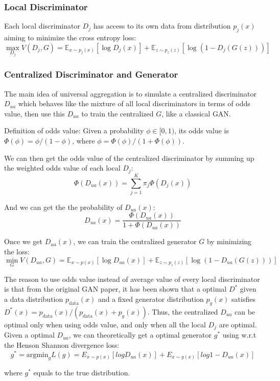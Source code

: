 \documentclass{article}
\begin{document}
\subsubsection{Local Discriminator}
Each local discriminator $D_j$ has access to its own data from distribution $p_j(x)$ aiming to minimize the cross entropy loss:
\[
\max_{D_j} V(D_j,G) = \mathbb{E}_{x \sim p_{j}(x)} [\log D_j(x)] + \mathbb{E}_{z \sim p_{z}(z)} [\log (1-D_j(G(z)))]
\]


\subsubsection{Centralized Discriminator and Generator}
The main idea of universal aggregation is to simulate a centralized discriminator $D_{ua}$ which behaves like the mixture of all local discriminators in terms of odds value, then use this $D_{ua}$ to train the centralized $G$, like a classical GAN.

Definition of odds value: Given a probability $\phi \in [0, 1)$, its odds value is $\Phi(\phi) = \phi / (1-\phi)$, where $\phi = \Phi(\phi) / (1+\Phi(\phi))$.

We can then get the odds value of the centralized discriminator by summing up the weighted odds value of each local $D_j$:
\[
\Phi(D_{ua}(x)) = \sum_{j=1}^K \pi_j \Phi(D_j(x))
\]

And we can get the the probability of $D_{ua}(x)$:
\[
D_{ua}(x) = \frac{\Phi(D_{ua}(x))}{1+\Phi(D_{ua}(x))}
\]

Once we get $D_{ua}(x)$, we can train the centralized generator $G$ by minimizing the loss:
\[
\min_{G} V(D_{ua},G) = \mathbb{E}_{x \sim p(x)} [\log D_{ua}(x)] + \mathbb{E}_{z \sim p_{z}(z)} [\log (1-D_{ua}(G(z)))]
\]

The reason to use odds value instead of average value of every local discriminator is that from the original GAN paper, it has been shown that a optimal $D^*$ given a data distribution $p_{\text{data}}(x)$ and a fixed generator distribution $p_{g}(x)$ satisfies $D^*{(x)} = p_{\text{data}}(x) / (p_{\text{data}}(x) + p_{g}(x))$. Thus, the centralized $D_{ua}$ can be optimal only when using odds value, and only when all the local $D_j$ are optimal.
Given a optimal $D_{ua}$, we can theoretically get a optimal generator $g^*$ using w.r.t the Henson Shannon divergence loss:
\[
g^* = \text{argmin}_g L(g) = E_{x \sim p(x)} [log D_{ua}(x)] + E_{x \sim g(x)} [log 1-D_{ua}(x)]
\]

where $g^*$ equals to the true distribution.
\end{document}
